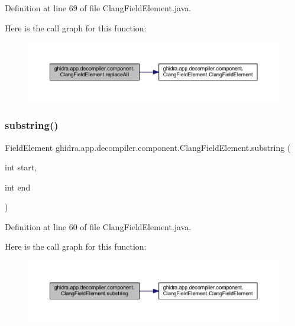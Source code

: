Definition at line 69 of file Clang\+Field\+Element.\+java.

Here is the call graph for this function\+:
\nopagebreak
\begin{figure}[H]
\begin{center}
\leavevmode
\includegraphics[width=350pt]{classghidra_1_1app_1_1decompiler_1_1component_1_1_clang_field_element_a2aeb0f4ecf97c903188cf0a973754a80_cgraph}
\end{center}
\end{figure}
\mbox{\label{classghidra_1_1app_1_1decompiler_1_1component_1_1_clang_field_element_ac5f021e840bc45a79878e059a408d519}} 
\subsubsection{\texorpdfstring{substring()}{substring()}}
{\footnotesize\ttfamily Field\+Element ghidra.\+app.\+decompiler.\+component.\+Clang\+Field\+Element.\+substring (\begin{DoxyParamCaption}\item[{int}]{start,  }\item[{int}]{end }\end{DoxyParamCaption})\hspace{0.3cm}{\ttfamily [inline]}}



Definition at line 60 of file Clang\+Field\+Element.\+java.

Here is the call graph for this function\+:
\nopagebreak
\begin{figure}[H]
\begin{center}
\leavevmode
\includegraphics[width=350pt]{classghidra_1_1app_1_1decompiler_1_1component_1_1_clang_field_element_ac5f021e840bc45a79878e059a408d519_cgraph}
\end{center}
\end{figure}


